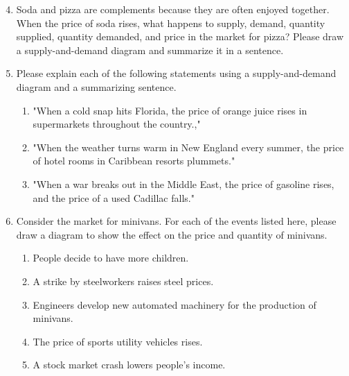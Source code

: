 \documentclass{article}
\begin{document}
\begin{enumerate}
\setcounter{enumi}{3}

\item Soda and pizza are complements because they are often enjoyed together. When the price of soda rises, what happens to supply, demand, quantity supplied, quantity demanded, and price in the market for pizza? Please draw a supply-and-demand diagram and summarize it in a sentence.

\item Please explain each of the following statements using a supply-and-demand diagram and a summarizing sentence.

	\begin{enumerate}
	
	\item "When a cold snap hits Florida, the price of orange juice rises in supermarkets throughout the country.,"
	
	\item "When the weather turns warm in New England every summer, the price of hotel rooms in Caribbean resorts plummets."
	
	\item "When a war breaks out in the Middle East, the price of gasoline rises, and the price of a used Cadillac falls."
	
	\end{enumerate}
	
\item Consider the market for minivans. For each of the events listed here, please draw a diagram to show the effect on the price and quantity of minivans.

	\begin{enumerate}
	
	\item People decide to have more children.
	
	\item A strike by steelworkers raises steel prices.
	
	\item Engineers develop new automated machinery for the production of minivans.
	
	\item The price of sports utility vehicles rises.
	
	\item A stock market crash lowers people's income.
	
	\end{enumerate}
	

\end{enumerate}
\end{document}
